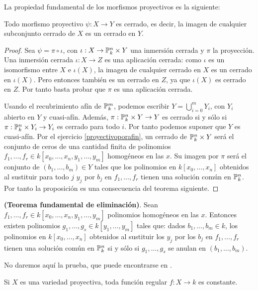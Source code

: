 \documentclass[ACGA.tex]{subfiles}
\begin{document}
La propiedad fundamental de los morfismos proyectivos es la siguiente:

\begin{prop}\label{proyectivocerrado}
 Todo morfismo proyectivo $\psi:X\to Y$ es cerrado, es decir, la imagen de cualquier subconjunto cerrado de $X$ es un cerrado en $Y$.
\end{prop}

\begin{proof}
 Sea $\psi=\pi\circ\iota$, con $\iota:X\to \mathbb{P}^n_k\times Y$ una inmersión cerrada y $\pi$ la proyección. Una inmersión cerrada $\iota:X\to Z$ es una aplicación cerrada: como $\iota$ es un isomorfismo entre $X$ e $\iota(X)$, la imagen de cualquier cerrado en $X$ es un cerrado en $\iota(X)$. Pero entonces también es un cerrado en $Z$, ya que $\iota(X)$ es cerrado en $Z$. Por tanto basta probar que $\pi$ es una aplicación cerrada.

Usando el recubrimiento afín de $\mathbb{P}^m_k$, podemos escribir $Y=\bigcup_{i=0}^m Y_i$, con $Y_i$ abierto en $Y$ y cuasi-afín. Además, $\pi:\mathbb{P}^n_k\times Y\to Y$ es cerrado si y sólo si $\pi:\mathbb{P}^n_k\times Y_i\to Y_i$ es cerrado para todo $i$. Por tanto podemos suponer que $Y$ es cuasi-afín. Por el ejercicio \ref{proyectivoporafin}, un cerrado de $\mathbb{P}^n_k\times Y$ será el conjunto de ceros de una cantidad finita de polinomios $f_1,\ldots,f_r\in k[x_0,\ldots,x_n,y_1,\ldots,y_m]$ homogéneos en las $x$. Su imagen por $\pi$ será el conjunto de $(b_1,\ldots,b_m)\in Y$ tales que los polinomios en $k[x_0,\ldots,x_n]$ obtenidos al sustituir para todo $j$ $y_j$ por $b_j$ en $f_1,\ldots,f_r$ tienen una solución común en $\mathbb{P}^n_k$. Por tanto la proposición es una consecuencia del teorema siguiente.
\end{proof}


\begin{teorema} \label{eliminacion} {\bf (Teorema fundamental de eliminación)}. Sean $f_1,\ldots,f_r\in k[x_0,\ldots,x_n,y_1,\ldots,y_m]$ polinomios homogéneos en las $x$. Entonces existen polinomios $g_1,\ldots,g_s\in k[y_1,\ldots,y_m]$ tales que: dados $b_1,\ldots,b_m\in k$, los polinomios en $k[x_0,\ldots,x_n]$ obtenidos al sustituir los $y_j$ por los $b_j$ en $f_1,\ldots,f_r$ tienen una solución común en $\mathbb{P}^n_k$ si y sólo si $g_1,\ldots,g_s$ se anulan en $(b_1,\ldots,b_m)$.
 \end{teorema}

No daremos aquí la prueba, que puede encontrarse en \cite[I.5.2]{sha}.

\begin{coro}
 Si $X$ es una variedad proyectiva, toda función regular $f:X\to k$ es constante.
\end{coro}
\end{document}
